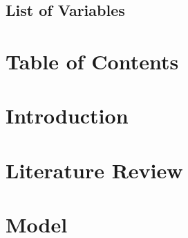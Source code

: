 \documentclass[
	12pt, 
	]{article}
\numberwithin{equation}{section}
\theoremstyle{definition}
\theoremstyle{plain}
\theoremstyle{plain}
\theoremstyle{plain}
\begin{document}

\subsection*{List of Variables} %

\thispagestyle{empty}

\newpage


\section*{Table of Contents}

{
	\setlength{\parskip}{1pt}
	\singlespacing
	\tableofcontents
}

\thispagestyle{empty}

\newpage


\section{Introduction}\label{sec:introduction}





\section{Literature Review}\label{sec:literature-review}



\newpage


\section{Model}\label{sec:model}


\end{document}
